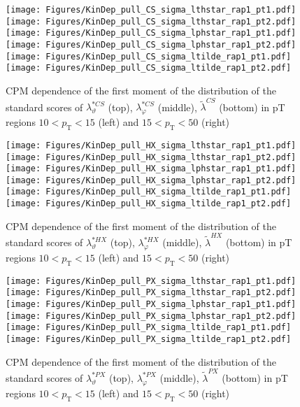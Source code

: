 \documentclass[12pt]{article}
\newcommand{\pT}{p_\mathrm{T}}
\newcommand{\lamtildeCS}{\tilde{\lambda}^{\scriptscriptstyle CS}}
\newcommand{\lamthstarCS}{\lambda^{* \scriptscriptstyle CS}_\vartheta}
\newcommand{\lamphstarCS}{\lambda^{* \scriptscriptstyle CS}_\varphi}
\newcommand{\lamtildeHX}{\tilde{\lambda}^{\scriptscriptstyle HX}}
\newcommand{\lamthstarHX}{\lambda^{* \scriptscriptstyle HX}_\vartheta}
\newcommand{\lamphstarHX}{\lambda^{* \scriptscriptstyle HX}_\varphi}
\newcommand{\lamtildePX}{\tilde{\lambda}^{\scriptscriptstyle PX}}
\newcommand{\lamthstarPX}{\lambda^{* \scriptscriptstyle PX}_\vartheta}
\newcommand{\lamphstarPX}{\lambda^{* \scriptscriptstyle PX}_\varphi}
\begin{document}
\begin{figure}[htbp]
\centering
\texttt{[image: Figures/KinDep\_pull\_CS\_sigma\_lthstar\_rap1\_pt1.pdf]}
\texttt{[image: Figures/KinDep\_pull\_CS\_sigma\_lthstar\_rap1\_pt2.pdf]}
\texttt{[image: Figures/KinDep\_pull\_CS\_sigma\_lphstar\_rap1\_pt1.pdf]}
\texttt{[image: Figures/KinDep\_pull\_CS\_sigma\_lphstar\_rap1\_pt2.pdf]}
\texttt{[image: Figures/KinDep\_pull\_CS\_sigma\_ltilde\_rap1\_pt1.pdf]}
\texttt{[image: Figures/KinDep\_pull\_CS\_sigma\_ltilde\_rap1\_pt2.pdf]}
\caption{CPM dependence of the first moment of the distribution of the
standard scores of $\lamthstarCS$ (top), $\lamphstarCS$ (middle), $\lamtildeCS$
(bottom) in pT regions $10<\pT<15$ (left) and $15<\pT<50$ (right)}
\end{figure}
\clearpage


\begin{figure}[htbp]
\centering
\texttt{[image: Figures/KinDep\_pull\_HX\_sigma\_lthstar\_rap1\_pt1.pdf]}
\texttt{[image: Figures/KinDep\_pull\_HX\_sigma\_lthstar\_rap1\_pt2.pdf]}
\texttt{[image: Figures/KinDep\_pull\_HX\_sigma\_lphstar\_rap1\_pt1.pdf]}
\texttt{[image: Figures/KinDep\_pull\_HX\_sigma\_lphstar\_rap1\_pt2.pdf]}
\texttt{[image: Figures/KinDep\_pull\_HX\_sigma\_ltilde\_rap1\_pt1.pdf]}
\texttt{[image: Figures/KinDep\_pull\_HX\_sigma\_ltilde\_rap1\_pt2.pdf]}
\caption{CPM dependence of the first moment of the distribution of the
standard scores of $\lamthstarHX$ (top), $\lamphstarHX$ (middle), $\lamtildeHX$
(bottom) in pT regions $10<\pT<15$ (left) and $15<\pT<50$ (right)}
\end{figure}
\clearpage


\begin{figure}[htbp]
\centering
\texttt{[image: Figures/KinDep\_pull\_PX\_sigma\_lthstar\_rap1\_pt1.pdf]}
\texttt{[image: Figures/KinDep\_pull\_PX\_sigma\_lthstar\_rap1\_pt2.pdf]}
\texttt{[image: Figures/KinDep\_pull\_PX\_sigma\_lphstar\_rap1\_pt1.pdf]}
\texttt{[image: Figures/KinDep\_pull\_PX\_sigma\_lphstar\_rap1\_pt2.pdf]}
\texttt{[image: Figures/KinDep\_pull\_PX\_sigma\_ltilde\_rap1\_pt1.pdf]}
\texttt{[image: Figures/KinDep\_pull\_PX\_sigma\_ltilde\_rap1\_pt2.pdf]}
\caption{CPM dependence of the first moment of the distribution of the
standard scores of $\lamthstarPX$ (top), $\lamphstarPX$ (middle), $\lamtildePX$
(bottom) in pT regions $10<\pT<15$ (left) and $15<\pT<50$ (right)}
\end{figure}
\clearpage
\end{document}
